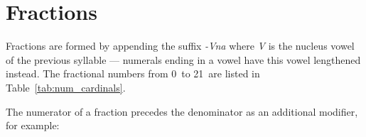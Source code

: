 \documentclass[grammar]{subfiles}
\begin{document}
  \section{Fractions}
  \label{sec:num_fractions}

  Fractions are formed by appending the suffix \textit{-Vna} where \textit{V} is the nucleus vowel of the previous syllable — numerals ending in a vowel have this vowel lengthened instead. The fractional numbers from 0\dec\ to 21\dec\ are listed in Table~\ref{tab:num_cardinals}.

  \begin{table}[htpb]\small\capstart
      \qquad
      \caption{Fractional numerals from 0\dec\ to 21\dec\label{tab:num_fractional}}
  \end{table}

  \newpage
  The numerator of a fraction precedes the denominator as an additional modifier, for example:
\end{document}
